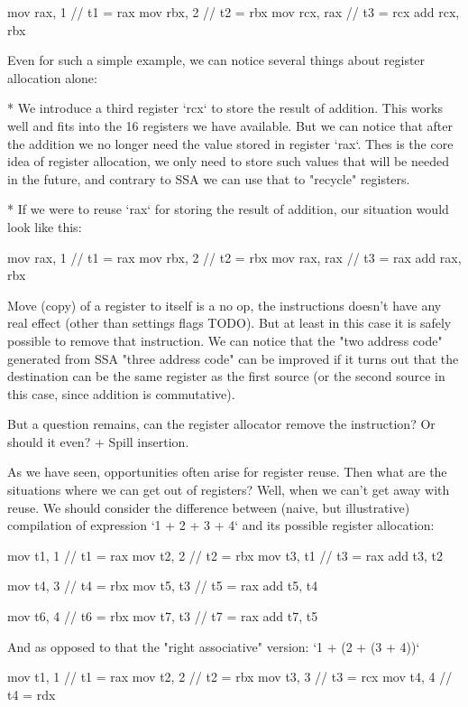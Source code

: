 \begtt
mov rax, 1   // t1 = rax
mov rbx, 2   // t2 = rbx
mov rcx, rax // t3 = rcx
add rcx, rbx
\endtt

Even for such a simple example, we can notice several things about register
allocation alone:

\begitems
 * We introduce a third register `rcx` to store the result of addition. This
works well and fits into the 16 registers we have available. But we can notice
that after the addition we no longer need the value stored in register `rax`.
Thes is the core idea of register allocation, we only need to store such values
that will be needed in the future, and contrary to SSA we can use that to
"recycle" registers.

* If we were to reuse `rax` for storing the result of addition, our situation
would look like this:

\begtt
mov rax, 1   // t1 = rax
mov rbx, 2   // t2 = rbx
mov rax, rax // t3 = rax
add rax, rbx
\endtt

Move (copy) of a register to itself is a no op, the instructions doesn't have
any real effect (other than settings flags TODO). But at least in this case it
is safely possible to remove that instruction. We can notice that the "two
address code" generated from SSA "three address code" can be improved if it
turns out that the destination can be the same register as the first source (or
the second source in this case, since addition is commutative).

But a question remains, can the register allocator remove the instruction?
Or should it even? + Spill insertion.
\enditems

As we have seen, opportunities often arise for register reuse. Then what are the
situations where we can get out of registers? Well, when we can't get away with
reuse. We should consider the difference between (naive, but illustrative)
compilation of expression `1 + 2 + 3 + 4` and its possible register allocation:

\begtt
mov t1, 1  // t1 = rax
mov t2, 2  // t2 = rbx
mov t3, t1 // t3 = rax
add t3, t2

mov t4, 3  // t4 = rbx
mov t5, t3 // t5 = rax
add t5, t4

mov t6, 4  // t6 = rbx
mov t7, t3 // t7 = rax
add t7, t5
\endtt

And as opposed to that the "right associative" version: `1 + (2 + (3 + 4))`

\begtt
mov t1, 1  // t1 = rax
mov t2, 2  // t2 = rbx
mov t3, 3  // t3 = rcx
mov t4, 4  // t4 = rdx

